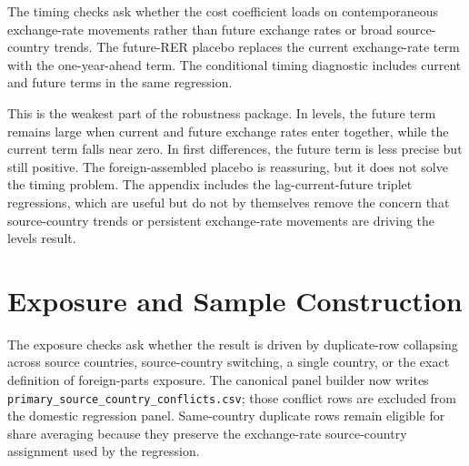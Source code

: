 \documentclass[11pt]{article}
\newcommand{\CurrentTableNote}{}
\newcommand{\settablefootnote}[1]{\renewcommand{\CurrentTableNote}{#1}}
\begin{document}
The timing checks ask whether the cost coefficient loads on contemporaneous exchange-rate movements rather than future exchange rates or broad source-country trends. The future-RER placebo replaces the current exchange-rate term with the one-year-ahead term. The conditional timing diagnostic includes current and future terms in the same regression.

\settablefootnote{Each row reports the exposure-weighted exchange-rate term named in the specification. Domestic specifications use the U.S.-assembled, source-country-stable panel. Foreign placebo specifications use the foreign-assembled, source-country-stable panel. Levels regressions include make-model and year fixed effects and log vehicle controls; first-difference regressions include year fixed effects and differenced controls. Standard errors are clustered by make-model.}

\settablefootnote{}

This is the weakest part of the robustness package. In levels, the future term remains large when current and future exchange rates enter together, while the current term falls near zero. In first differences, the future term is less precise but still positive. The foreign-assembled placebo is reassuring, but it does not solve the timing problem. The appendix includes the lag-current-future triplet regressions, which are useful but do not by themselves remove the concern that source-country trends or persistent exchange-rate movements are driving the levels result.

\section{Exposure and Sample Construction}

The exposure checks ask whether the result is driven by duplicate-row collapsing across source countries, source-country switching, a single country, or the exact definition of foreign-parts exposure. The canonical panel builder now writes \texttt{primary\_source\_country\_conflicts.csv}; those conflict rows are excluded from the domestic regression panel. Same-country duplicate rows remain eligible for share averaging because they preserve the exchange-rate source-country assignment used by the regression.

\settablefootnote{Rows re-estimate the baseline current-RER regression after omitting rows whose primary source country is the country listed. Levels regressions include make-model and year fixed effects and log vehicle controls; first-difference regressions include year fixed effects and differenced controls. Standard errors are clustered by make-model.}

\settablefootnote{}
\end{document}
